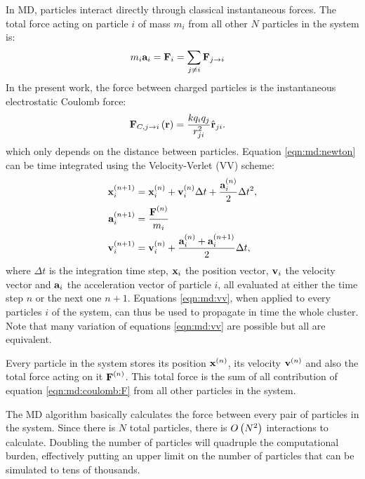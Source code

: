 In MD, particles interact directly through classical instantaneous forces. The
total force acting on particle $i$ of mass $m_i$ from all other $N$ particles in
the system is:
\begin{align}
m_i \textbf{a}_i & = \textbf{F}_i = \sum_{j \ne i} \textbf{F}_{j \rightarrow i}
\label{eqn:md:newton}
\end{align}
In the present work, the force between charged particles is the instantaneous
electrostatic Coulomb force:
\begin{align}
\textbf{F}_{C,j \rightarrow i}\left( \textbf{r} \right) & =\frac{k q_i q_j}{r_{ji}^2} \hat{\textbf{r}}_{ji}.
\label{eqn:md:coulomb:F}
\end{align}
which only depends on the distance between particles. Equation
\eqref{eqn:md:newton} can be time integrated using the Velocity-Verlet (VV)
scheme:
\begin{subequations}
\begin{align}
\textbf{x}_{i}^{\left( n+1 \right)} & = \textbf{x}_{i}^{\left( n \right)} + \textbf{v}_{i}^{\left( n \right)} \Delta t +
\frac{\textbf{a}_{i}^{\left( n \right)}}{2} \Delta t^2, \\
\textbf{a}_{i}^{\left( n+1 \right)} & = \frac{\textbf{F}^{\left( n \right)}}{m_i} \label{eqn:md:vv:a} \\
\textbf{v}_{i}^{\left( n+1 \right)} & = \textbf{v}_{i}^{\left( n \right)} + \frac{\textbf{a}_{i}^{\left( n \right)} +
\textbf{a}_{i}^{\left( n+1 \right)}}{2} \Delta t,
\end{align}
\label{eqn:md:vv}
\end{subequations}
where $\Delta t$ is the integration time step, $\textbf{x}_{i}$ the position vector,
$\textbf{v}_{i}$ the velocity vector and $\textbf{a}_{i}$ the acceleration vector of
particle $i$, all evaluated at either the time step $n$ or the next one $n+1$.
Equations \eqref{eqn:md:vv}, when applied to every particles $i$ of the system,
can thus be used to propagate in time the whole cluster. Note that many
variation of equations \eqref{eqn:md:vv} are possible but all are equivalent.

Every particle in the system stores its position $\textbf{x}^{\left( n \right)}$, its velocity
$\textbf{v}^{\left( n \right)}$ and also the total force acting on it $\textbf{F}^{\left( n \right)}$. This total
force is the sum of all contribution of equation \eqref{eqn:md:coulomb:F} from
all other particles in the system.

The MD algorithm basically calculates the force between every pair of particles
in the system. Since there is $N$ total particles, there is $O\left( N^2 \right)$
interactions to calculate. Doubling the number of particles will quadruple the
computational burden, effectively putting an upper limit on the number of
particles that can be simulated to tens of thousands.


